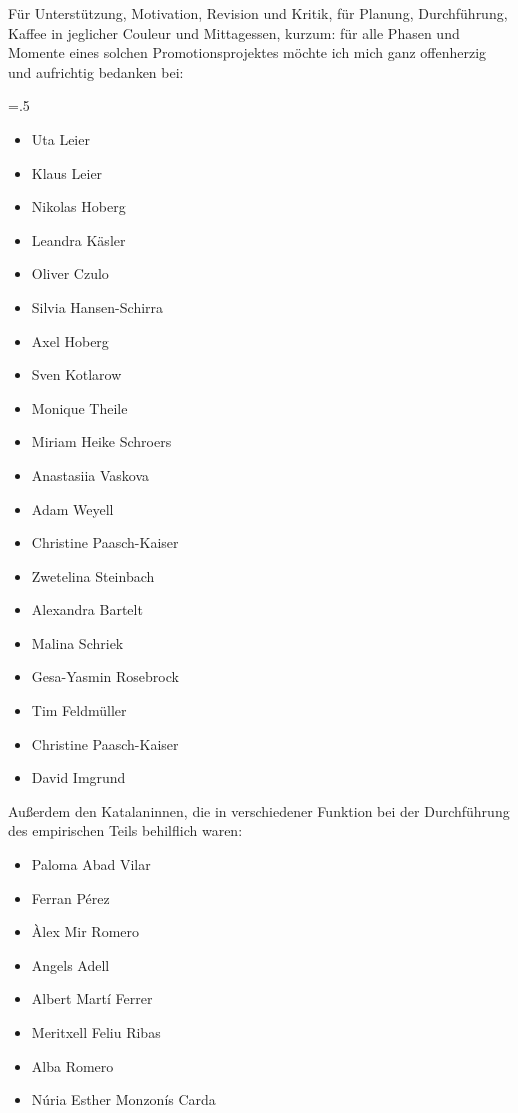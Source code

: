 \addchap{\lsAcknowledgementTitle} 

\noindent Für Unterstützung, Motivation, Revision und Kritik, für Planung, Durchführung, Kaffee in jeglicher Couleur und Mittagessen, kurzum: für alle Phasen und Momente eines solchen Promotionsprojektes möchte ich mich ganz offenherzig und aufrichtig bedanken bei:

{\multicolsep=.5\baselineskip\begin{multicols}{2}

    \begin{itemize}[noitemsep]
    \item[] Uta Leier
    \item[] Klaus Leier
    \item[] Nikolas Hoberg
    \item[] Leandra Käsler
    \item[] Oliver Czulo
    \item[] Silvia Hansen-Schirra
    \item[] Axel Hoberg
    \item[] Sven Kotlarow
    \item[] Monique Theile
    \item[] Miriam Heike Schroers
    \item[] Anastasiia Vaskova
    \item[] Adam Weyell
    \item[] Christine Paasch-Kaiser
    \item[] Zwetelina Steinbach
    \item[] Alexandra Bartelt
    \item[] Malina Schriek
    \item[] Gesa-Yasmin Rosebrock
    \item[] Tim Feldmüller
    \item[] Christine Paasch-Kaiser
    \item[] David Imgrund
    \end{itemize}
\end{multicols}


\noindent Außerdem den Katalan{\textperiodcentered}innen, die in verschiedener Funktion bei der Durchführung des empirischen Teils behilflich waren:

\begin{multicols}{2}
    \begin{itemize}[noitemsep]
    \item[] Paloma Abad Vilar
    \item[] Ferran Pérez
    \item[] Àlex Mir Romero
    \item[] Angels Adell
    \item[] Albert Martí Ferrer
    \item[] Meritxell Feliu Ribas
    \item[] Alba Romero
    \item[] Núria Esther Monzonís Carda
    \end{itemize}
\end{multicols}}
